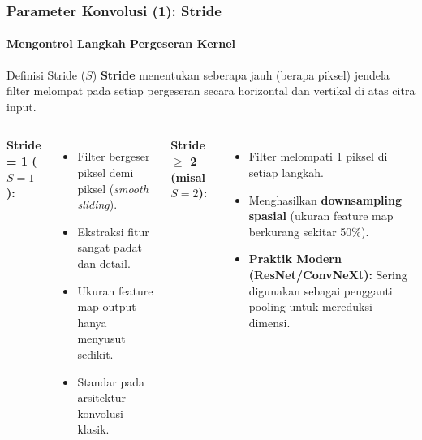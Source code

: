 \documentclass[t,aspectratio=169,xcolor=dvipsnames]{beamer}
\begin{document}
\begin{frame}
    \frametitle{Parameter Konvolusi (1): Stride}
    \framesubtitle{Mengontrol Langkah Pergeseran Kernel}
    \small

    \begin{block}{Definisi Stride ($S$)}
        \textbf{Stride} menentukan seberapa jauh (berapa piksel) jendela filter melompat pada setiap pergeseran secara horizontal dan vertikal di atas citra input.
    \end{block}

    \begin{columns}[t]
        \textbf{Stride = 1 ($S=1$):}
        \begin{itemize}
            \item Filter bergeser piksel demi piksel (\textit{smooth sliding}).
            \item Ekstraksi fitur sangat padat dan detail.
            \item Ukuran feature map output hanya menyusut sedikit.
            \item Standar pada arsitektur konvolusi klasik.
        \end{itemize}

        \textbf{Stride $\ge$ 2 (misal $S=2$):}
        \begin{itemize}
            \item Filter melompati 1 piksel di setiap langkah.
            \item Menghasilkan \textbf{downsampling spasial} (ukuran feature map berkurang sekitar 50\%).
            \item \textbf{Praktik Modern (ResNet/ConvNeXt):} Sering digunakan sebagai pengganti pooling untuk mereduksi dimensi.
        \end{itemize}
    \end{columns}
\end{frame}
\end{document}
